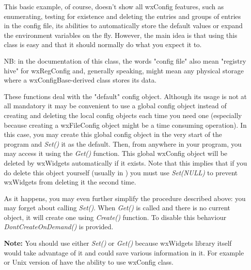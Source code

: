 This basic example, of course, doesn't show all wxConfig features, such as
enumerating, testing for existence and deleting the entries and groups of
entries in the config file, its abilities to automatically store the default
values or expand the environment variables on the fly. However, the main idea
is that using this class is easy and that it should normally do what you
expect it to.

NB: in the documentation of this class, the words "config file" also mean
"registry hive" for wxRegConfig and, generally speaking, might mean any
physical storage where a wxConfigBase-derived class stores its data.



\label{wxconfigstaticfunctions}

These functions deal with the "default" config object. Although its usage is
not at all mandatory it may be convenient to use a global config object
instead of creating and deleting the local config objects each time you need
one (especially because creating a wxFileConfig object might be a time
consuming operation). In this case, you may create this global config object
in the very start of the program and {\it Set()} it as the default. Then, from
anywhere in your program, you may access it using the {\it Get()} function.
This global wxConfig object will be deleted by wxWidgets automatically if it
exists. Note that this implies that if you do delete this object yourself
(usually in ) you must use {\it Set(NULL)}
to prevent wxWidgets from deleting it the second time.

As it happens, you may even further simplify the procedure described above:
you may forget about calling {\it Set()}. When {\it Get()} is called and there
is no current object, it will create one using {\it Create()} function. To
disable this behaviour {\it DontCreateOnDemand()} is provided.

{\bf Note:} You should use either {\it Set()} or {\it Get()} because wxWidgets
library itself would take advantage of it and could save various information
in it. For example  or Unix version
of  have the ability to use wxConfig class.

\\
\\
\\


